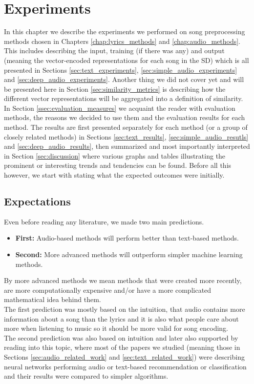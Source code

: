 \chapter{Experiments}\label{chap:experiments}

In this chapter we describe the experiments we performed on song preprocessing methods chosen in Chapters \ref{chap:lyrics_methods} and \ref{chap:audio_methods}. This includes describing the input, training (if there was any) and output (meaning the vector-encoded representations for each song in the SD) which is all presented in Sections \ref{sec:text_experiments}, \ref{sec:simple_audio_experiments} and \ref{sec:deep_audio_experiments}. Another thing we did not cover yet and will be presented here in Section \ref{sec:similarity_metrics} is describing how the different vector representations will be aggregated into a definition of similarity.\\
In Section \ref{ssec:evaluation_measures} we acquaint the reader with evaluation methods, the reasons we decided to use them and the evaluation results for each method. The results are first presented separately for each method (or a group of closely related methods) in Sections \ref{sec:text_results}, \ref{sec:simple_audio_resutls} and \ref{sec:deep_audio_results}, then summarized and most importantly interpreted in Section \ref{sec:discussion} where various graphs and tables illustrating the prominent or interesting trends and tendencies can be found. Before all this however, we start with stating what the expected outcomes were initially.

\section{Expectations}\label{sec:expectations}

Even before reading any literature, we made two main predictions. 
\begin{itemize}
    \item \textbf{First:} Audio-based methods will perform better than text-based methods.
    \item \textbf{Second:} More advanced methods will outperform simpler machine learning methods.
\end{itemize} 
By more advanced methods we mean methods that were created more recently, are more computationally expensive and/or have a more complicated mathematical idea behind them. \\
The first prediction was mostly based on the intuition, that audio contains more information about a song than the lyrics and it is also what people care about more when listening to music so it should be more valid for song encoding. \\
The second prediction was also based on intuition and later also supported by reading into this topic, where most of the papers we studied (meaning those in Sections \ref{sec:audio_related_work} and \ref{sec:text_related_work}) were describing neural networks performing audio or text-based recommendation or classification and their results were compared to simpler algorithms. \\

